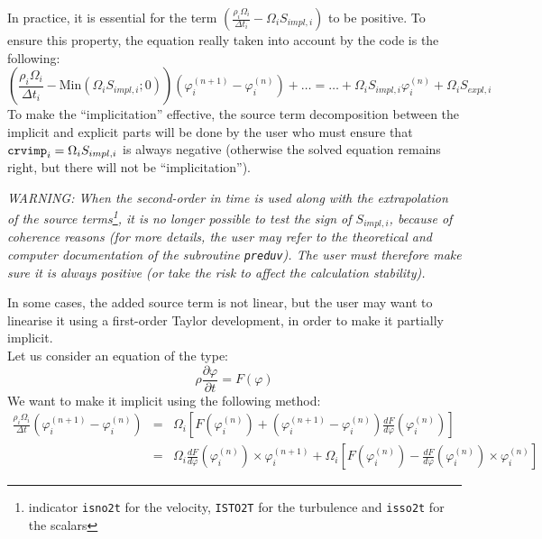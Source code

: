 {{{In practice, it is essential for the term
$\displaystyle \left(\frac{\rho_i\Omega_i}{\Delta
t_i}-\Omega_iS_{impl,i}\right)$ to be positive. To ensure this property,
the equation really taken into account by the code is the following:
\begin{displaymath}
\left(\frac{\rho_i\Omega_i}{\Delta t_i}-
\text{Min}(\Omega_iS_{impl,i};0)\right)
\left(\varphi_i^{(n+1)}-\varphi_i^{(n)}\right)
+\ldots = \ldots + \Omega_iS_{impl,i}\varphi_i^{(n)} + \Omega_iS_{expl,i}
\end{displaymath}
To make the ``implicitation'' effective, the source term decomposition
between the implicit and explicit parts will be done by the user who must
ensure that $\text{\texttt{crvimp}}_i=\Omega_iS_{impl,i}$ is always negative
(otherwise the solved equation remains right, but there will not be
``implicitation'').

{\em WARNING: When the second-order in time is used along with the extrapolation of the
source terms\footnote{indicator \texttt{isno2t} for the velocity,
\texttt{ISTO2T} for the turbulence and \texttt{isso2t} for the scalars}, it is no longer possible to test the sign of $S_{impl,i}$,
because of coherence reasons (for more details, the user may refer to
the theoretical and computer documentation \cite{theory} of the
subroutine \texttt{preduv}). The user must therefore make sure it is
always positive (or take the risk to affect the calculation stability).}


In some cases, the added source term is not linear, but the user may
want to linearise it using a first-order Taylor development, in order to
make it partially implicit.\\
Let us consider an equation of the type:
\begin{displaymath}
\rho\frac{\partial\varphi}{\partial t}=F(\varphi)
\end{displaymath}
We want to make it implicit using the following method:
\begin{eqnarray*}
\frac{\rho_i\Omega_i}{\Delta t}\left(\varphi_i^{(n+1)}-\varphi_i^{(n)}\right) & = &
\Omega_i\left[F(\varphi_i^{(n)})+\left(\varphi_i^{(n+1)}-\varphi_i^{(n)}\right)
\frac{dF}{d\varphi}(\varphi_i^{(n)})\right]\\
& = & \Omega_i\frac{dF}{d\varphi}(\varphi_i^{(n)})\times\varphi_i^{(n+1)}
+\Omega_i\left[F(\varphi_i^{(n)})-\frac{dF}{d\varphi}(\varphi_i^{(n)})
\times\varphi_i^{(n)}\right]
\end{eqnarray*}

}}}
